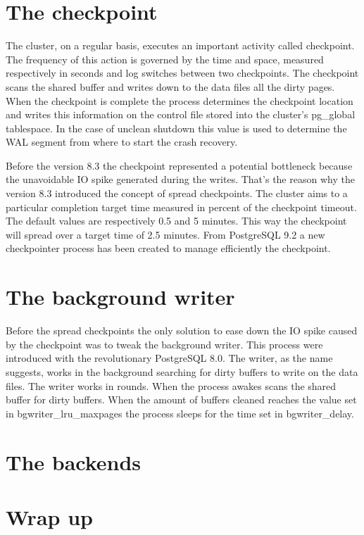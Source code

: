 \section{The checkpoint}
The cluster, on a regular basis, executes an important activity called checkpoint. The frequency 
of this action is governed by the time and space, measured respectively in seconds and log switches between 
two checkpoints. The checkpoint scans the shared buffer and writes down to the data files all the dirty 
pages. When the checkpoint is complete the process determines the checkpoint location and writes this 
information on the control file stored into the cluster's pg\_global tablespace. In the case of unclean 
shutdown this value is used to determine the WAL segment from where to start the crash recovery. \newline

Before the version 8.3 the checkpoint represented a potential bottleneck because the unavoidable IO spike 
generated during the writes. That's the reason why the version 8.3 introduced the concept of spread 
checkpoints. The cluster aims to a particular completion target time measured in percent of the checkpoint 
timeout. The default values are respectively 0.5 and 5 minutes. This way the checkpoint will spread over a 
target time of 2.5 minutes. From PostgreSQL 9.2 a new checkpointer process has been created to manage 
efficiently the checkpoint.


\section{The background writer}
Before the spread checkpoints the only solution to ease down the IO spike caused by the checkpoint was to 
tweak the background writer. This process were introduced with the revolutionary PostgreSQL 8.0. The 
writer, as the name suggests, works in the background searching for dirty buffers to write on the data 
files. The writer works in rounds. When the process awakes scans the shared buffer for dirty buffers. When 
the amount of buffers cleaned reaches the value set in bgwriter\_lru\_maxpages the process sleeps for the 
time set in bgwriter\_delay. 


\section{The backends}

\section{Wrap up}
